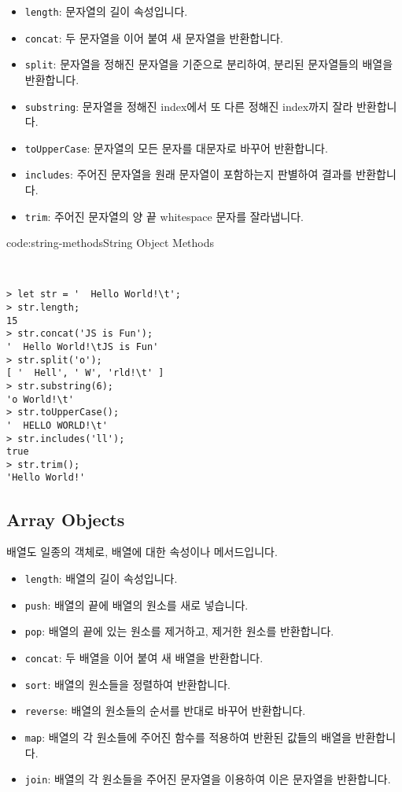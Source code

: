 \begin{itemize}
    \item \texttt{length}: 문자열의 길이 속성입니다. 
    \item \texttt{concat}: 두 문자열을 이어 붙여 새 문자열을 반환합니다. 
    \item \texttt{split}: 문자열을 정해진 문자열을 기준으로 분리하여, 분리된 문자열들의 배열을 반환합니다. 
    \item \texttt{substring}: 문자열을 정해진 index에서 또 다른 정해진 index까지 잘라 반환합니다.
    \item \texttt{toUpperCase}: 문자열의 모든 문자를 대문자로 바꾸어 반환합니다. 
    \item \texttt{includes}: 주어진 문자열을 원래 문자열이 포함하는지 판별하여 결과를 반환합니다. 
    \item \texttt{trim}: 주어진 문자열의 양 끝 whitespace 문자를 잘라냅니다. 
\end{itemize}

\begin{codeenv}{code:string-methods}{String Object Methods}\begin{verbatim}


> let str = '  Hello World!\t';
> str.length;
15
> str.concat('JS is Fun');
'  Hello World!\tJS is Fun'
> str.split('o');
[ '  Hell', ' W', 'rld!\t' ]
> str.substring(6);
'o World!\t'
> str.toUpperCase();
'  HELLO WORLD!\t'
> str.includes('ll');
true
> str.trim();
'Hello World!'
\end{verbatim}
\end{codeenv}

\subsection*{Array Objects}

배열도 일종의 객체로, 배열에 대한 속성이나 메서드입니다. 

\begin{itemize}
    \item \texttt{length}: 배열의 길이 속성입니다. 
    \item \texttt{push}: 배열의 끝에 배열의 원소를 새로 넣습니다. 
    \item \texttt{pop}: 배열의 끝에 있는 원소를 제거하고, 제거한 원소를 반환합니다. 
    \item \texttt{concat}: 두 배열을 이어 붙여 새 배열을 반환합니다. 
    \item \texttt{sort}: 배열의 원소들을 정렬하여 반환합니다. 
    \item \texttt{reverse}: 배열의 원소들의 순서를 반대로 바꾸어 반환합니다. 
    \item \texttt{map}: 배열의 각 원소들에 주어진 함수를 적용하여 반환된 값들의 배열을 반환합니다. 
    \item \texttt{join}: 배열의 각 원소들을 주어진 문자열을 이용하여 이은 문자열을 반환합니다. 
\end{itemize}

